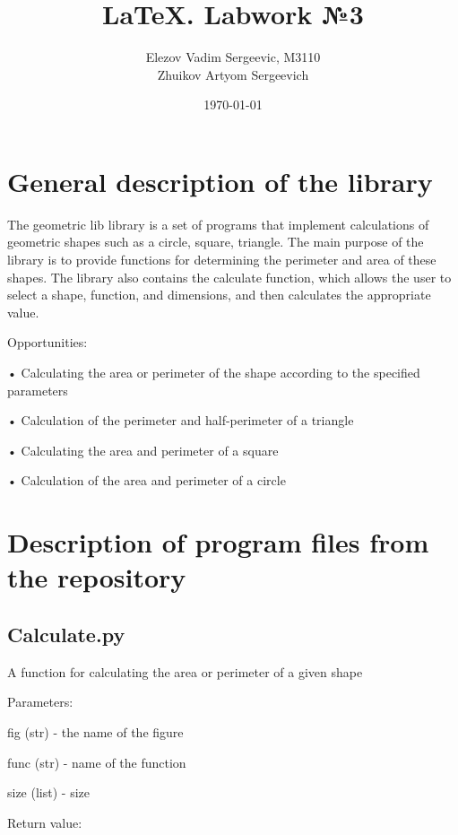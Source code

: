 \documentclass[12pt]{article}
\author{Elezov Vadim Sergeevic, M3110 \\
Zhuikov Artyom Sergeevich}
\date{\today}
\title{LaTeX. Labwork №3}
\begin{document}
\maketitle

\newpage
\tableofcontents

\newpage
\section{General description of the library}
The geometric lib library is a set of programs that implement calculations of geometric shapes such as a circle, square, triangle. The main purpose of the library is to provide functions for determining the perimeter and area of these shapes. The library also contains the calculate function, which allows the user to select a shape, function, and dimensions, and then calculates the appropriate value.


Opportunities:

    • Calculating the area or perimeter of the shape according to the specified parameters
    
    • Calculation of the perimeter and half-perimeter of a triangle
    
    • Calculating the area and perimeter of a square
    
    • Calculation of the area and perimeter of a circle

\newpage
    
\section{Description of program files from the repository}

\subsection{Calculate.py} 
A function for calculating the area or perimeter of a given shape

Parameters: 

    fig (str) - the name of the figure 

    func (str) - name of the function

    size (list) - size 

Return value: 
\end{document}
